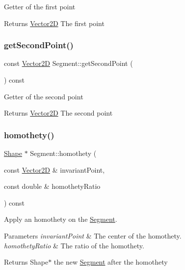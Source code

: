 Getter of the first point \begin{DoxyReturn}{Returns}
\hyperlink{class_vector2_d}{Vector2D} The first point 
\end{DoxyReturn}
\hypertarget{class_segment_a7d7d1e5fa25f759f6bf0912925c9e922}{}\label{class_segment_a7d7d1e5fa25f759f6bf0912925c9e922} 
\subsubsection{\texorpdfstring{get\+Second\+Point()}{getSecondPoint()}}
{\footnotesize\ttfamily const \hyperlink{class_vector2_d}{Vector2D} Segment\+::get\+Second\+Point (\begin{DoxyParamCaption}{ }\end{DoxyParamCaption}) const}

Getter of the second point \begin{DoxyReturn}{Returns}
\hyperlink{class_vector2_d}{Vector2D} The second point 
\end{DoxyReturn}
\hypertarget{class_segment_a5fe8d9711a0d3405a8c4cf3270069ee3}{}\label{class_segment_a5fe8d9711a0d3405a8c4cf3270069ee3} 
\subsubsection{\texorpdfstring{homothety()}{homothety()}}
{\footnotesize\ttfamily \hyperlink{class_shape}{Shape} $\ast$ Segment\+::homothety (\begin{DoxyParamCaption}\item[{const \hyperlink{class_vector2_d}{Vector2D} \&}]{invariant\+Point,  }\item[{const double \&}]{homothety\+Ratio }\end{DoxyParamCaption}) const\hspace{0.3cm}{\ttfamily [virtual]}}

Apply an homothety on the \hyperlink{class_segment}{Segment}. 
\begin{DoxyParams}{Parameters}
{\em invariant\+Point} & The center of the homothety. \\
\hline
{\em homothety\+Ratio} & The ratio of the homothety. \\
\hline
\end{DoxyParams}
\begin{DoxyReturn}{Returns}
Shape$\ast$ the new \hyperlink{class_segment}{Segment} after the homothety 
\end{DoxyReturn}


